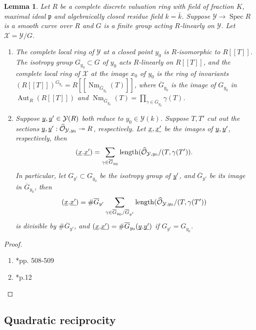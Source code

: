 \documentclass{amsart}
\numberwithin{equation}{subsection}
\numberwithin{theorem}{section}
\newtheorem{lemma}[theorem]{Lemma}
\theoremstyle{definition}
\theoremstyle{remark}
\newcommand{\cO}{\mathcal{O}}
\newcommand{\cX}{\mathcal{X}}
\newcommand{\cY}{\mathcal{Y}}
\newcommand{\fp}{\mathfrak{p}}
\newcommand{\ul}[1]{\underline{\smash{#1}}}
\DeclareMathOperator{\Nm}{Nm}
\DeclareMathOperator{\Aut}{Aut}
\DeclareMathOperator{\Spec}{Spec}
\begin{document}
\begin{lemma}\label{lem:intersection_auto}
    Let $R$ be a complete discrete valuation ring with field of fraction $K$, maximal ideal $\fp$ and algebraically closed residue field $k = \bar{k}$. Suppose $\cY \to \Spec R$ is a smooth curve over $R$ and $G$ is a finite group acting $R$-linearly on $\cY$.  
    Let $\cX = \cY/G$.
    \begin{enumerate}
        \item The complete local ring of $\cY$ at a closed point $y_0$ is $R$-isomorphic to $R[[T]]$. The isotropy group $G_{y_0} \subset G$ of $y_0$ acts $R$-linearly on $R[[T]]$, and the complete local ring of $\cX$ at the image $x_0$ of $y_0$ is the ring of invariants $\left(R[[T]]\right)^{G_{y_0}} = R[[\Nm_{\overline{G}_{y_0}}(T)]]$, where $\overline{G}_{y_0}$ is the image of $G_{y_0}$ in $\Aut_{R}(R[[T]])$ and $\Nm_{\overline{G}_{y_0}}(T) = \prod_{\gamma\in \overline{G}_{y_0}} \gamma(T)$. 
        \item Suppose $\ul{y}, \ul{y}' \in \cY(R)$ both reduce to $y_0 \in \cY(k)$. Suppose $T, T'$ cut out the sections $\ul{y}, \ul{y}': \widehat{\cO}_{\cY, y_0} \twoheadrightarrow{} R$, respectively. Let $\ul{x}, \ul{x'}$ be the images of $\ul{y}, \ul{y}'$, respectively, then \[(\ul{x}.\ul{x'}) = \sum_{\gamma\in \overline{G}_{y_0}}\mathrm{length} (\widehat{\cO}_{\cY, y_0} / (T, \gamma(T')).\]
        In particular, let $G_{y'} \subset G_{y_0}$ be the isotropy group of $\ul{y}'$, and $\overline{G}_{y'}$ be its image in $\overline{G}_{y_0}$, then \[(\ul{x}.\ul{x'}) = \# \overline{G}_{y'}\sum_{\gamma\in \overline{G}_{y_0}/ \overline{G}_{y'}}\mathrm{length} (\widehat{\cO}_{\cY, y_0} / (T, \gamma(T'))\] is divisible by $\# \overline{G}_{y'}$, and $(\ul{x}.\ul{x'}) = \# \overline{G}_{y_0}(\ul{y}.\ul{y'})$ if $G_{y'} = G_{y_0}$. 
    \end{enumerate}
\end{lemma}
\begin{proof}
    \begin{enumerate}
        \item \cite{MR772569}*{pp. 508-509}
        \item \cite{MR2083211}*{p.12}
    \end{enumerate}
\end{proof}


\subsection{Quadratic reciprocity}
\end{document}
